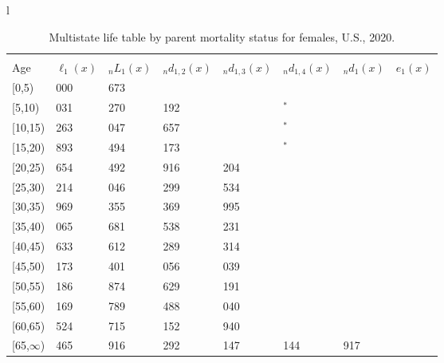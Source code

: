 \documentclass[
]{article}
\begin{document}
\begin{table}
\caption{\label{tab:table-female}Multistate life table by parent mortality status for females, U.S., 2020.}

\centering
\fontsize{9}{11}\selectfont
\begin{tabular}[t]{l}
\hline
\begin{tabular}{>{\raggedright\arraybackslash}p{.45in}>{\raggedleft\arraybackslash}p{.65in}>{\raggedleft\arraybackslash}p{.65in}>{\raggedleft\arraybackslash}p{.65in}>{\raggedleft\arraybackslash}p{.65in}>{\raggedleft\arraybackslash}p{.65in}>{\raggedleft\arraybackslash}p{.65in}>{\raggedleft\arraybackslash}p{.65in}}
\toprule
\multicolumn{1}{c}{ } & \multicolumn{7}{c}{(1) Lost neither} \\
\cmidrule(l{3pt}r{3pt}){2-8}
Age & $\ell_{1}(x)$ & ${}_nL_{1}(x)$ & ${}_nd_{1,2}(x)$ & ${}_nd_{1,3}(x)$ & ${}_nd_{1,4}(x)$ & ${}_nd_{1}(x)$ & $e_{1}(x)$\\
\midrule
{}[0,5) & 100 000 & 494 673 & 952 & 392 & 57 & 568 & 43\\
{}[5,10) & 98 031 & 486 270 & 1 192 & 527 & 2$^{*}$ & 47 & 38\\
{}[10,15) & 96 263 & 476 047 & 1 657 & 625 & 28$^{*}$ & 61 & 34\\
{}[15,20) & 93 893 & 461 494 & 2 173 & 885 & 32$^{*}$ & 149 & 29\\
{}[20,25) & 90 654 & 440 492 & 2 916 & 1 204 & 71 & 250 & 24\\
\addlinespace
{}[25,30) & 86 214 & 414 046 & 3 299 & 1 534 & 80 & 333 & 20\\
{}[30,35) & 80 969 & 379 355 & 4 369 & 1 995 & 118 & 421 & 16\\
{}[35,40) & 74 065 & 336 681 & 5 538 & 2 231 & 167 & 496 & 12\\
{}[40,45) & 65 633 & 282 612 & 6 289 & 3 314 & 302 & 554 & 9\\
{}[45,50) & 55 173 & 220 401 & 7 056 & 3 039 & 274 & 617 & 6\\
\addlinespace
{}[50,55) & 44 186 & 152 874 & 7 629 & 3 191 & 564 & 634 & 3\\
{}[55,60) & 32 169 & 91 789 & 6 488 & 3 040 & 542 & 575 & 2\\
{}[60,65) & 21 524 & 41 715 & 4 152 & 1 940 & 581 & 385 & 1\\
{}[65,$\infty$) & 14 465 & 37 916 & 4 292 & 2 147 & 1 144 & 1 917 & 0\\
\end{tabular}\\
\end{tabular}

\end{table}
\end{document}
